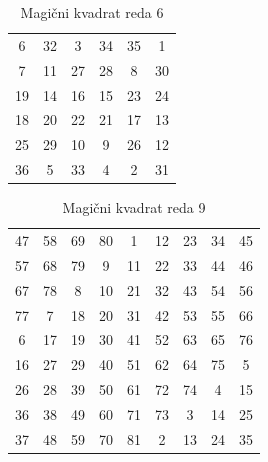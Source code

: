 \documentclass[a4paper,12pt]{article}
\begin{document}
\begin{table}
   \centering
   \caption{Magični kvadrat reda 6}
   \label{table:mag6}
   \begin{tabular}{cccccc}\toprule
            6 & 32 &  3 & 34 & 35 &  1 \\
            7 & 11 & 27 & 28 &  8 & 30 \\
           19 & 14 & 16 & 15 & 23 & 24 \\
           18 & 20 & 22 & 21 & 17 & 13 \\
           25 & 29 & 10 &  9 & 26 & 12 \\
           36 &  5 & 33 &  4 &  2 & 31 \\ \bottomrule
   \end{tabular}
\end{table}

\begin{table}
   \centering
   \caption{Magični kvadrat reda 9}
   \label{table:mag9}
   \begin{tabular}{ccccccccc} \toprule
           47 & 58 & 69 & 80 &  1 & 12 & 23 & 34 & 45 \\
           57 & 68 & 79 &  9 & 11 & 22 & 33 & 44 & 46 \\
           67 & 78 &  8 & 10 & 21 & 32 & 43 & 54 & 56 \\
           77 &  7 & 18 & 20 & 31 & 42 & 53 & 55 & 66 \\
            6 & 17 & 19 & 30 & 41 & 52 & 63 & 65 & 76 \\
           16 & 27 & 29 & 40 & 51 & 62 & 64 & 75 &  5 \\
           26 & 28 & 39 & 50 & 61 & 72 & 74 &  4 & 15 \\
           36 & 38 & 49 & 60 & 71 & 73 &  3 & 14 & 25 \\
           37 & 48 & 59 & 70 & 81 &  2 & 13 & 24 & 35 \\ \bottomrule
   \end{tabular}
\end{table}


\newpage




\end{document}
